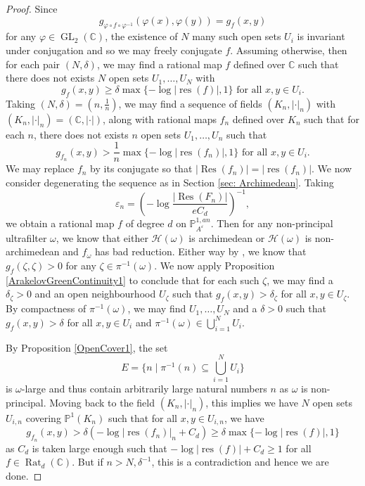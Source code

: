 \documentclass[10pt]{amsart}
\newcommand{\bb}{\mathbb}
\newcommand{\vphi}{\varphi}
\newcommand{\Res}{\operatorname{Res}}
\newcommand{\res}{\operatorname{res}}
\newcommand{\berkP}{\mathbb{P}^{1,an}}
\newcommand{\cal}{\mathcal}
\newcommand{\eps}{\varepsilon}
\newcommand{\Rat}{\operatorname{Rat}}
\newcommand{\GL}{\operatorname{GL}}
\numberwithin{theorem}{section}
\numberwithin{example}{section}
\numberwithin{definition}{section}
\begin{document}
\begin{proof}
Since 
$$g_{\vphi \circ f \circ \vphi^{-1}}(\vphi(x),\vphi(y)) = g_f(x,y)$$
for any $\vphi \in \GL_2(\bb{C})$, the existence of $N$ many such open sets $U_i$ is invariant under conjugation and so we may freely conjugate $f$. Assuming otherwise, then for each pair $(N,\delta)$, we may find a rational map $f$ defined over $\bb{C}$ such that there does not exists $N$ open sets $U_1,\ldots,U_N$ with 
$$g_f(x,y) \geq \delta \max\{-\log |\res(f)|,1\} \text{ for all }x,y \in U_i.$$
Taking $(N,\delta) = (n, \frac{1}{n})$, we may find a sequence of fields $(K_n, | \cdot |_n)$ with $(K_n, | \cdot |_n) = (\bb{C},| \cdot |)$, along with rational maps $f_n$ defined over $K_n$ such that for each $n$, there does not exists $n$ open sets $U_1,\ldots,U_n$ such that 
$$g_{f_n}(x,y) > \frac{1}{n} \max\{-\log |\res(f_n)|,1\} \text{ for all } x,y \in U_i.$$
We may replace $f_n$ by its conjugate so that $|\Res(f_n)| = |\res(f_n)|$. We now consider degenerating the sequence as in Section \ref{sec: Archimedean}. Taking 
$$\eps_n = \left(-\log \frac{|\Res(F_n)|}{eC_d} \right)^{-1},$$
we obtain a rational map $f$ of degree $d$ on $\berkP_{A^{\eps}}$. Then for any non-principal ultrafilter $\omega$, we know that either $\cal{H}(\omega)$ is archimedean or $\cal{H}(\omega)$ is non-archimedean and $f_{\omega}$ has bad reduction. Either way by \cite[Theorem 1.12]{Bak09}, we know that $g_f(\zeta,\zeta) > 0$ for any $\zeta \in \pi^{-1}(\omega)$. We now apply Proposition \ref{ArakelovGreenContinuity1} to conclude that for each such $\zeta$, we may find a $\delta_{\zeta} > 0$ and an open neighbourhood $U_{\zeta}$ such that $g_f(x,y) > \delta_{\zeta}$ for all $x,y \in U_{\zeta}$. By compactness of $\pi^{-1}(\omega)$, we may find $U_1,\ldots,U_N$ and a $\delta > 0$ such that $g_f(x,y) > \delta$ for all $x,y \in U_i$ and $\pi^{-1}(\omega) \in \bigcup_{i=1}^{N} U_i$. 
\par 
By Proposition \ref{OpenCover1}, the set 
$$E = \{n \mid \pi^{-1}(n) \subseteq \bigcup_{i=1}^{N} U_i\}$$
is $\omega$-large and thus contain arbitrarily large natural numbers $n$ as $\omega$ is non-principal. Moving back to the field $(K_n, | \cdot |_n)$, this implies we have $N$ open sets $U_{i,n}$ covering $\bb{P}^1(K_n)$ such that for all $x,y \in U_{i,n}$, we have 
$$g_{f_n}(x,y) > \delta (- \log |\res(f_n)|_n + C_d) \geq \delta \max\{- \log |\res(f)|,1\}$$
as $C_d$ is taken large enough such that $-\log |\res(f)| + C_d \geq 1$ for all $f \in \Rat_d(\bb{C})$. But if $n > N, \delta^{-1}$, this is a contradiction and hence we are done. 
\end{proof}
\end{document}
